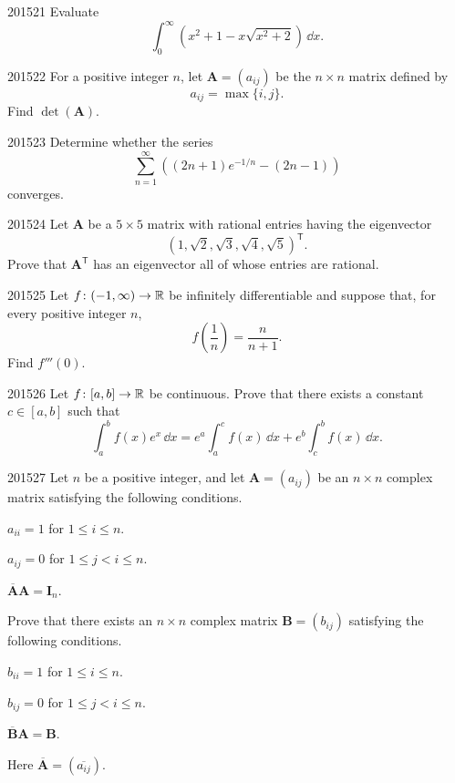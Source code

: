 
\begin{problem}{2015}{2}{1}
Evaluate
\[
    \int_0^{\infty}
    \left(x^2+1-x\sqrt{x^2+2}\right)\, \dd x.
\]
\end{problem}

\begin{problem}{2015}{2}{2}
For a positive integer $n$, let $\mathbf A=(a_{ij})$ be the $n\times n$ matrix defined by
\[
    a_{ij}=\max\{i, j\}.
\]
Find $\det(\mathbf A)$.
\end{problem}

\begin{problem}{2015}{2}{3}
Determine whether the series
\[
    \sum_{n=1}^{\infty}
    \left((2n+1)e^{-1/n}-(2n-1)\right)
\]
converges.
\end{problem}

\begin{problem}{2015}{2}{4}
Let $\mathbf A$ be a $5\times5$ matrix with rational entries having the eigenvector
\[
    (1, \sqrt2, \sqrt3, \sqrt4, \sqrt5)^{\mathsf T}.
\]
Prove that $\mathbf A^{\mathsf T}$ has an eigenvector all of whose entries are rational.
\end{problem}

\begin{problem}{2015}{2}{5}
Let $f\colon(-1, \infty)\to\mathbb{R}$ be infinitely differentiable and suppose that, for every positive integer $n$,
\[
    f\!\left(\frac1n\right)=\frac{n}{n+1}.
\]
Find $f'''(0)$.
\end{problem}

\begin{problem}{2015}{2}{6}
Let $f\colon[a, b]\to\mathbb{R}$ be continuous. Prove that there exists a constant $c\in[a, b]$ such that
\[
    \int_a^b f(x)e^x\, \dd x
    =
    e^a\int_a^c f(x)\, \dd x
    +e^b\int_c^b f(x)\, \dd x.
\]
\end{problem}

\begin{problem}{2015}{2}{7}
Let $n$ be a positive integer, and let $\mathbf A=(a_{ij})$ be an $n\times n$ complex matrix satisfying the following conditions.
\begin{problemclauses}
    \item $a_{ii}=1$ for $1\le i\le n$.
    \item $a_{ij}=0$ for $1\le j<i\le n$.
    \item $\overline{\mathbf A}\mathbf A=\mathbf I_n$.
\end{problemclauses}
Prove that there exists an $n\times n$ complex matrix $\mathbf B=(b_{ij})$ satisfying the following conditions.
\begin{problemclauses}
    \item $b_{ii}=1$ for $1\le i\le n$.
    \item $b_{ij}=0$ for $1\le j<i\le n$.
    \item $\overline{\mathbf B}\mathbf A=\mathbf B$.
\end{problemclauses}
Here $\overline{\mathbf A}=(\overline{a_{ij}})$.
\end{problem}

